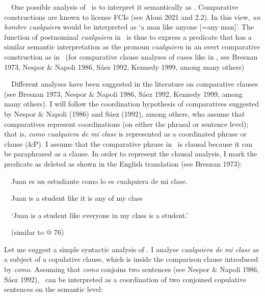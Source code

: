 \begin{styleStandard}
\ \ One possible analysis of \ is to interpret it semantically as . Comparative constructions are known to license FCIs (see Aloni 2021 and 2.2). In this view, \textit{un hombre cualquiera }would be interpreted as ‘a man like anyone [=any man]’. The function of postnominal \textit{cualquiera} in \ is thus to express a predicate that has a similar semantic interpretation as the pronoun \textit{cualquiera} in an overt comparative construction as in \ (for comparative clause analyses of cases like in , see Bresnan 1973, Nespor \& Napoli 1986, Sáez 1992, Kennedy 1999, among many others)
\end{styleStandard}

\begin{styleStandard}
\ \ Different analyses have been suggested in the literature on comparative clauses (see Bresnan 1973, Nespor \& Napoli 1986, Sáez 1992, Kennedy 1999, among many others). I will follow the coordination hypothesis of comparatives suggested by Nespor \& Napoli (1986) and Sáez (1992), among others, who assume that comparatives represent coordinations (on either the phrasal or sentence level); that is, \textit{como cualquiera de mi clase} is represented as a coordinated phrase or clause (\&P). I assume that the comparative phrase in \ is clausal because it can be paraphrased as a clause. In order to represent the clausal analysis, I mark the predicate as deleted as shown in the English translation (see Bresnan 1973):
\end{styleStandard}

\begin{styleStandard}
\label{bkm:Ref72354047}\ \ Juan es un estudiante como lo es cualquiera de mi clase.
\end{styleStandard}

\begin{styleStandard}
\ \ Juan is a student like it is any of my class
\end{styleStandard}

\begin{styleStandard}
\ \ ‘Juan is a student like everyone in my class is a student.’
\end{styleStandard}

\begin{styleStandard}
\ \ (similar to @ 76)
\end{styleStandard}

\begin{styleStandard}
Let me suggest a simple syntactic analysis of . I analyse \textit{cualquiera de mi clase} as a subject of a copulative clause, which is inside the comparison clause introduced by \textit{como}. Assuming that \textit{como} conjoins two sentences (see Nespor \& Napoli 1986, Sáez 1992), \ can be interpreted as a coordination of two conjoined copulative sentences on the semantic level:
\end{styleStandard}


